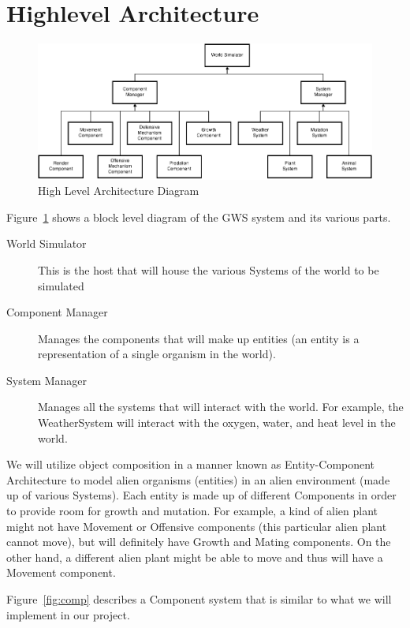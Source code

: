 \chapter*{Highlevel Architecture}

\begin{figure}[h]
\includegraphics[width=\textwidth]{architecture.png}
\caption{High Level Architecture Diagram}
\label{fig:arch}
\end{figure}

Figure~\ref{fig:arch} shows a block level diagram of the GWS system and its various parts.

\begin{description}
\item[World Simulator] This is the host that will house the various Systems of the world to be simulated
\item[Component Manager] Manages the components that will make up entities (an entity is a representation of a single organism in the world).
\item[System Manager] Manages all the systems that will interact with the world. For example, the WeatherSystem will interact with the oxygen, water, and heat level in the world.
\end{description}

We will utilize object composition in a manner known as Entity-Component Architecture to model alien organisms (entities) in an alien environment (made up of various Systems). Each entity is made up of different Components in order to provide room for growth and mutation. For example, a kind of alien plant might not have Movement or Offensive components (this particular alien plant cannot move), but will definitely have Growth and Mating components. On the other hand, a different alien plant might be able to move and thus will have a Movement component.

Figure~\ref{fig:comp} describes a Component system that is similar to what we will implement in our project.

